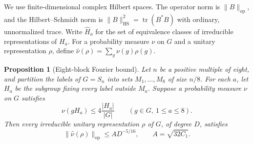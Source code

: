 \documentclass[11pt]{article}
\newtheorem{proposition}[theorem]{Proposition}
\theoremstyle{remark}
\numberwithin{equation}{section}
\begin{document}
We use finite-dimensional complex Hilbert spaces. The operator norm is
$\|B\|_{\mathrm{op}}$, and the Hilbert--Schmidt norm is
$\|B\|_{\mathrm{HS}}^2=\operatorname{tr}(B^*B)$ with ordinary,
unnormalized trace. Write $\widehat H_a$ for the set of equivalence classes of irreducible representations of $H_a$. For a probability measure \(\nu\) on \(G\) and a unitary representation \(\rho\), define
\(\widehat\nu(\rho)=\sum_g\nu(g)\rho(g)\).
\begin{proposition}[Eight-block Fourier bound]\label{prop:orbit-lift}
Let \(n\) be a positive multiple of eight, and partition the labels of \(G=S_n\) into sets \(M_1,\ldots,M_8\) of size \(n/8\). For each \(a\), let \(H_a\) be the subgroup fixing every label outside \(M_a\). Suppose a probability measure \(\nu\) on \(G\) satisfies
\[
 \nu(gH_a)\le4\frac{|H_a|}{|G|}
 \qquad(g\in G,\ 1\le a\le8).
\]
Then every irreducible unitary representation \(\rho\) of \(G\), of degree \(D\), satisfies
\begin{equation}\label{eq:h-12}
 \|\widehat\nu(\rho)\|_{\mathrm{op}}
 \le A D^{-5/16},\qquad A=\sqrt{32C_1}.
\end{equation}
\end{proposition}
\end{document}
